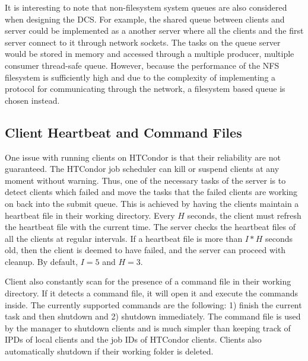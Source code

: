 \documentclass{article}
\begin{document}
It is interesting to note that non-filesystem system queues are also considered when designing the DCS. For example, the shared queue between clients and server could be implemented as a another server where all the clients and the first server connect to it through network sockets. The tasks on the queue server would be stored in memory and accessed through a multiple producer, multiple consumer thread-safe queue. However, because the performance of the NFS filesystem is sufficiently high and due to the complexity of implementing a protocol for communicating through the network, a filesystem based queue is chosen instead.

\subsection{Client Heartbeat and Command Files}

One issue with running clients on HTCondor is that their reliability are not guaranteed. The HTCondor job scheduler can kill or suspend clients at any moment without warning. Thus, one of the necessary tasks of the server is to detect clients which failed and move the tasks that the failed clients are working on back into the submit queue. This is achieved by having the clients maintain a heartbeat file in their working directory. Every $H$ seconds, the client must refresh the heartbeat file with the current time. The server checks the heartbeat files of all the clients at regular intervals. If a heartbeat file is more than $I * H$ seconds old, then the client is deemed to have failed, and the server can proceed with cleanup. By default, $I=5$ and $H=3$.

Client also constantly scan for the presence of a command file in their working directory. If it detects a command file, it will open it and execute the commands inside. The currently supported commands are the following: 1) finish the current task and then shutdown and 2) shutdown immediately. The command file is used by the manager to shutdown clients and is much simpler than keeping track of IPDs of local clients and the job IDs of HTCondor clients. Clients also automatically shutdown if their working folder is deleted.
\end{document}
